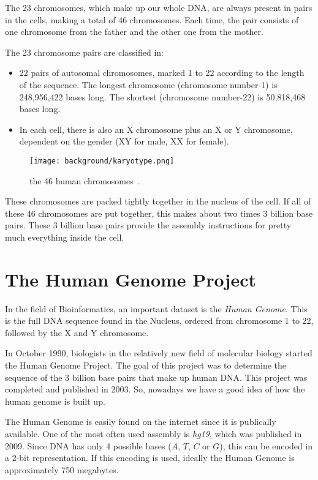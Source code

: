 The 23 chromosomes, which make up our whole DNA, are always present in pairs in the cells, making a total of 46 chromosomes. Each time, the pair consists of one chromosome from the father and the other one from the mother. 

The 23 chromosome pairs are classified in:
\begin{itemize}
	\item 22 pairs of autosomal chromosomes, marked 1 to 22 according to the length of the sequence. The longest chromosome (chromosome number-1) is 248,956,422 bases long. The shortest (chromosome number-22) is 50,818,468 bases long.
	\item In each cell, there is also an X chromosome plus an X or Y chromosome, dependent on the gender (XY for male, XX for female).
\end{itemize}


\begin{figure}[H]
	\centering
	\texttt{[image: background/karyotype.png]}
	\caption{the 46 human chromosomes~\cite{8}.}
	\label{fig:karyotype}
\end{figure}

These chromosomes are packed tightly together in the nucleus of the cell. If all of these 46 chromosomes are put together, this makes about two times 3 billion base pairs. These 3 billion base pairs provide the assembly instructions for pretty much everything inside the cell.


\section{The Human Genome Project}

In the field of Bioinformatics, an important dataset is the \emph{Human Genome}. This is the full DNA sequence found in the Nucleus, ordered from chromosome 1 to 22, followed by the X and Y chromosome.

In October 1990, biologists in the relatively new field of molecular biology started the Human Genome Project. The goal of this project was to determine the sequence of the 3 billion base pairs that make up human DNA. This project was completed and published in 2003. So, nowadays we have a good idea of how the human genome is built up.

The Human Genome is easily found on the internet since it is publically available. One of the most often used assembly is \emph{hg19}, which was published in 2009. Since DNA has only 4 possible bases ($A$, $T$, $C$ or $G$), this can be encoded in a 2-bit representation. If this encoding is used, ideally the Human Genome is approximately 750 megabytes.

